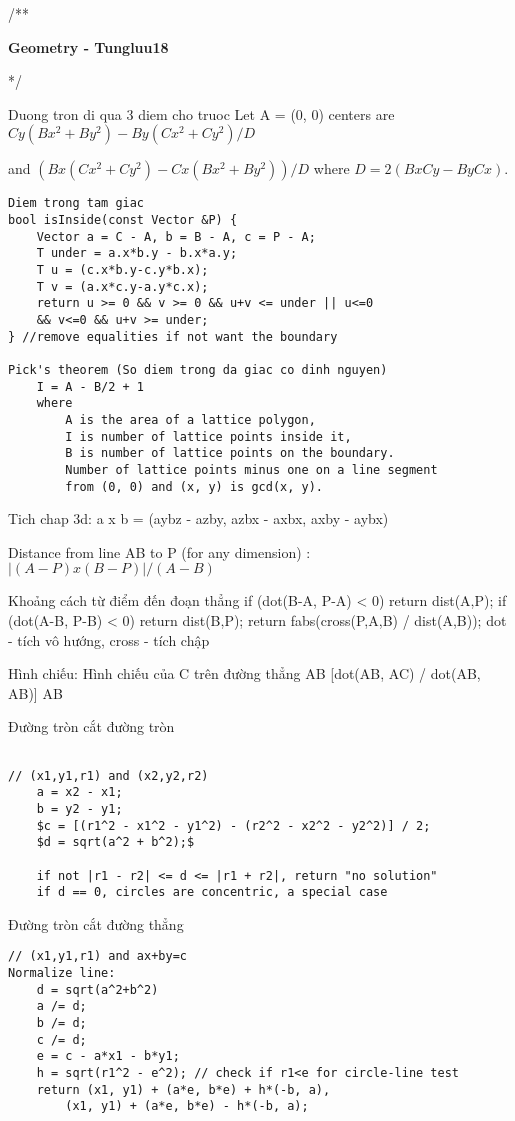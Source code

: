 /**

 \textbf{Geometry - Tungluu18}

 */
 
Duong tron di qua 3 diem cho truoc
	Let A = (0, 0) centers are 
	$Cy(Bx^2 + By^2) - By(Cx^2 + Cy^2)/D$
  
		and
	$(Bx(Cx^2 + Cy^2) - Cx(Bx^2 + By^2))/D$
		where 
	$D = 2(BxCy - ByCx).$
 
 \begin{lstlisting}
Diem trong tam giac
bool isInside(const Vector &P) {
	Vector a = C - A, b = B - A, c = P - A;
	T under = a.x*b.y - b.x*a.y;
	T u = (c.x*b.y-c.y*b.x);
	T v = (a.x*c.y-a.y*c.x);
	return u >= 0 && v >= 0 && u+v <= under || u<=0 
	&& v<=0 && u+v >= under;
} //remove equalities if not want the boundary
 
Pick's theorem (So diem trong da giac co dinh nguyen) 
	I = A - B/2 + 1
	where 
		A is the area of a lattice polygon,
		I is number of lattice points inside it,
		B is number of lattice points on the boundary.
		Number of lattice points minus one on a line segment 
		from (0, 0) and (x, y) is gcd(x, y).
 \end{lstlisting}
 
Tich chap 3d: a x b = (aybz - azby, azbx - axbx, axby - aybx)
 
Distance from line AB to P (for any dimension) : $|(A - P) x (B - P)| / (A - B)$
 
Khoảng cách từ điểm đến đoạn thẳng
	if (dot(B-A, P-A) < 0) return dist(A,P);
	if (dot(A-B, P-B) < 0) return dist(B,P);
	return fabs(cross(P,A,B) / dist(A,B));
	dot - tích vô hướng, cross - tích chập
 
Hình chiếu:
	Hình chiếu của C trên đường thẳng AB [dot(AB, AC) / dot(AB, AB)] AB
 
 Đường tròn cắt đường tròn 
  \begin{lstlisting}

// (x1,y1,r1) and (x2,y2,r2)
	a = x2 - x1;
	b = y2 - y1;
	$c = [(r1^2 - x1^2 - y1^2) - (r2^2 - x2^2 - y2^2)] / 2;
	$d = sqrt(a^2 + b^2);$
 
	if not |r1 - r2| <= d <= |r1 + r2|, return "no solution"
	if d == 0, circles are concentric, a special case
  \end{lstlisting}
  
Đường tròn cắt đường thẳng
\begin{lstlisting}
// (x1,y1,r1) and ax+by=c
Normalize line: 
	d = sqrt(a^2+b^2)
	a /= d; 
	b /= d; 
	c /= d;
	e = c - a*x1 - b*y1;
	h = sqrt(r1^2 - e^2); // check if r1<e for circle-line test
	return (x1, y1) + (a*e, b*e) + h*(-b, a),
		(x1, y1) + (a*e, b*e) - h*(-b, a);
 \end{lstlisting}
 
